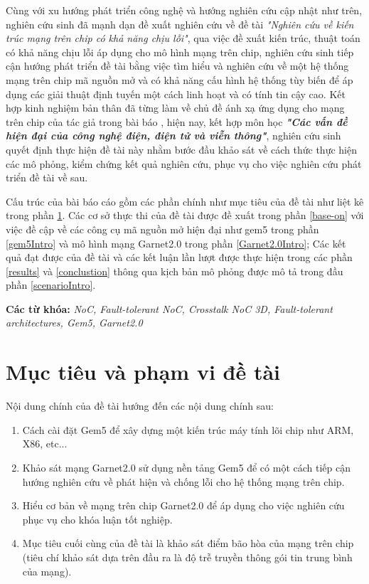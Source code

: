 \documentclass{article}
\begin{document}
Cùng với xu hướng phát triển công nghệ và hướng nghiên cứu cập nhật như trên, nghiên cứu sinh đã mạnh dạn đề xuất nghiên cứu về đề tài \textit{"Nghiên cứu về kiến trúc mạng trên chip có khả năng chịu lỗi"}, qua việc đề xuất kiến trúc, thuật toán có khả năng chịu lỗi áp dụng cho mô hình mạng trên chip, nghiên cứu sinh tiếp cận hướng phát triển đề tài bằng việc tìm hiểu và nghiên cứu về một hệ thống mạng trên chip mã nguồn mở và có khả năng cấu hình hệ thống tùy biến để áp dụng các giải thuật định tuyến một cách linh hoạt và có tính tin cậy cao. Kết hợp kinh nghiệm bản thân đã từng làm về chủ đề ánh xạ ứng dụng cho mạng trên chip của tác giả trong bài báo \cite{dinh_idpso_2017}, hiện nay, kết hợp môn học \textbf{\textit{"Các vấn đề hiện đại của công nghệ điện, điện tử và viễn thông"}}, nghiên cứu sinh quyết định thực hiện đề tài này nhằm bước đầu khảo sát về cách thức thực hiện các mô phỏng, kiểm chứng kết quả nghiên cứu, phục vụ cho việc nghiên cứu phát triển đề tài về sau.

Cấu trúc của bài báo cáo gồm các phần chính như mục tiêu của đề tài như liệt kê trong phần \ref{objective}. Các cơ sở thực thi của đề tài được đề xuất trong phần \ref{base-on} với việc đề cập về các công cụ mã nguồn mở hiện đại như gem5 trong phần \ref{gem5Intro} và mô hình mạng Garnet2.0 trong phần \ref{Garnet2.0Intro}; Các kết quả đạt được của đề tài và các kết luận lần lượt được thực hiện trong các phần \ref{results} và \ref{conclustion} thông qua kịch bản mô phỏng được mô tả trong đầu phần \ref{scenarioIntro}.

\textbf{Các từ khóa:} \textit{NoC, Fault-tolerant NoC, Crosstalk NoC 3D, Fault-tolerant architectures, Gem5, Garnet2.0}
\section{Mục tiêu và phạm vi đề tài} \label{objective}
Nội dung chính của đề tài hướng đến các nội dung chính sau:
	\begin{enumerate}
		\item Cách cài đặt Gem5 để xây dựng một kiến trúc máy tính lõi chip như ARM, X86, etc...
		\item Khảo sát mạng Garnet2.0 sử dụng nền tảng Gem5 để có một cách tiếp cận hướng nghiên cứu về phát hiện và chống lỗi cho hệ thống mạng trên chip.
		\item Hiểu cơ bản về mạng trên chip Garnet2.0 để áp dụng cho việc nghiên cứu phục vụ cho khóa luận tốt nghiệp.
		\item Mục tiêu cuối cùng của đề tài là khảo sát điểm bão hòa của mạng trên chip (tiêu chí khảo sát dựa trên đầu ra là độ trễ truyền thông gói tin trung bình của mạng).
	\end{enumerate}
\end{document}
